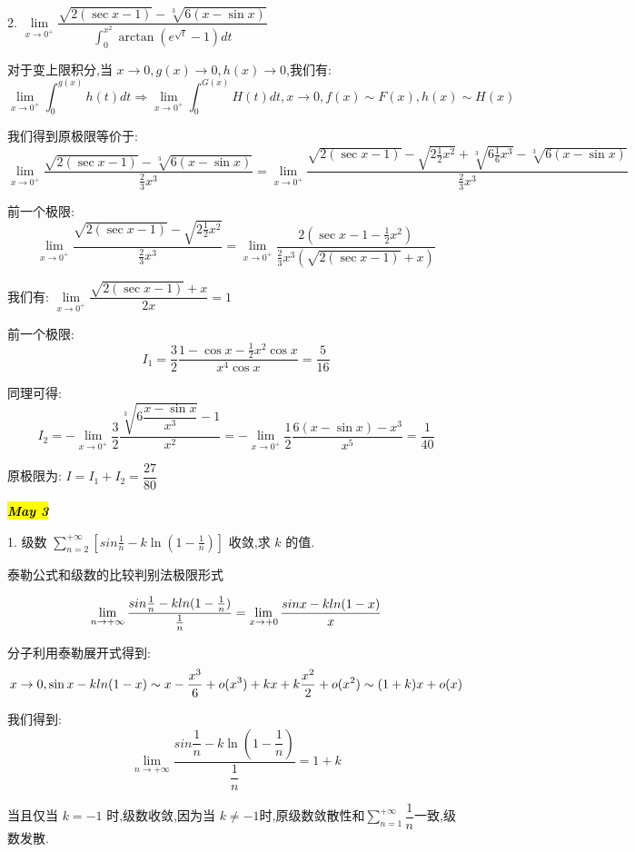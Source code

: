2. $\lim\limits_{x\rightarrow 0^{+}}\dfrac{\sqrt{2(\sec x-1)}-\sqrt[3]{6(x-\sin x)}}{\int_{0}^{x^2}\arctan (e^{\sqrt{t}}-1)dt}$
\begin{solution}
	
	对于变上限积分,当 $x\rightarrow 0,g(x)\rightarrow 0,h(x)\rightarrow 0$,我们有: 
	$$\lim\limits_{x\rightarrow 0^{+}}\int_{0}^{g(x)}h(t)dt\Rightarrow \lim\limits_{x\rightarrow 0^{+}}\int_{0}^{G(x)}H(t)dt,x\rightarrow 0,f(x)\sim F(x),h(x)\sim H(x)$$
	
	我们得到原极限等价于: 
	$$\lim\limits_{x\rightarrow 0^{+}}\frac{\sqrt{2(\sec x-1)}-\sqrt[3]{6(x-\sin x)}}{\frac{2}{3}x^3}=\lim\limits_{x\rightarrow 0^{+}}\frac{\sqrt{2(\sec x-1)}-\sqrt{2\frac{1}{2}x^2}+\sqrt[3]{6\frac{1}{6}x^3}-\sqrt[3]{6(x-\sin x)}}{\frac{2}{3}x^3}$$
	
	前一个极限: $$\lim\limits_{x\rightarrow 0^{+}}\frac{\sqrt{2(\sec x-1)}-\sqrt{2\frac{1}{2}x^2}}{\frac{2}{3}x^3}=\lim\limits_{x\rightarrow 0^{+}}\frac{2(\sec x-1-\frac{1}{2}x^2)}{\frac{2}{3}x^3(\sqrt{2(\sec x-1)}+x)}$$
	
	我们有: $\lim\limits_{x\rightarrow 0^{+}}\dfrac{\sqrt{2(\sec x-1)}+x}{2x}=1$
	
	前一个极限: $$I_{1}=\frac{3}{2}\frac{1-\cos x-\frac{1}{2}x^2\cos x}{x^4\cos x}=\frac{5}{16}$$
	
	同理可得: $$I_{2}=-\lim\limits_{x\rightarrow 0^{+}}\frac{3}{2}\frac{\sqrt[3]{6\dfrac{x-\sin x}{x^3}}-1}{x^2}=-\lim\limits_{x\rightarrow 0^{+}}\frac{1}{2}\frac{6(x-\sin x)-x^3}{x^5}=\frac{1}{40}$$
	
	原极限为: $I=I_{1}+I_{2}=\dfrac{27}{80}$
\end{solution}


\hl{\textbf{\textit{May 3}}}

1. 级数 $\sum\limits_{n=2}^{+\infty}[sin \frac{1}{n}-k\ln(1-\frac{1}{n})]$ 收敛,求 $k$ 的值.
\begin{solution}
	
	泰勒公式和级数的比较判别法极限形式
	
	$$\lim\limits_{n\rightarrow+\infty}\frac{sin \frac{1}{n}-k\\ln(1-\frac{1}{n})}{\frac{1}{n}}=\lim\limits_{x\rightarrow+0}\frac{sin x-k\\ln(1-x)}{x}$$
	
	分子利用泰勒展开式得到: 
	$$x\rightarrow 0,\sin x-k\\ln(1-x)\sim x-\frac{x^3}{6}+o(x^3)+kx+k\frac{x^2}{2}+o(x^2)\sim (1+k)x+o(x)$$
	
	我们得到: 
	$$\lim\limits_{n\rightarrow+\infty}\dfrac{sin \dfrac{1}{n}-k\ln(1-\dfrac{1}{n})}{\dfrac{1}{n}}=1+k$$
	
	当且仅当 $k=-1$ 时,级数收敛,因为当 $k\neq -1$时,原级数敛散性和$\sum\limits_{n=1}^{+\infty}\dfrac{1}{n}$一致,级数发散.
\end{solution}

